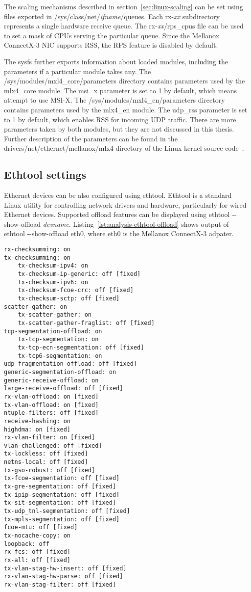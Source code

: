 The scaling mechanisms described in section~\ref{sec:linux-scaling} can be set
using files exported in /sys/class/net/{\it{ifname}}/queues.
Each rx-{\it{xx}} subdirectory represents a single hardware receive queue.
The rx-{\it{xx}}/rps_cpus file can be used to set a mask of CPUs serving the particular queue.
Since the Mellanox ConnectX-3 NIC supports RSS, the RPS feature is disabled by default.


The sysfs further exports information about loaded modules, including the parameters if a particular module takes any.
The /sys/modules/mxl4\_core/parameters directory contains parameters used by the mlx4\_core module.
The msi\_x parameter is set to 1 by default, which means attempt to use MSI-X.
The /sys/modules/mxl4\_en/parameters directory contains parameters used by the mlx4\_en module.
The udp\_rss parameter is set to 1 by default, which enables RSS for incoming UDP traffic.
There are more parameters taken by both modules, but they are not discussed in this thesis.
Further description of the parameters can be found
in the drivers/net/ethernet/mellanox/mlx4 directory of the Linux kernel source code~\cite{kernel-source}.

\subsection{Ethtool settings}
Ethernet devices can be also configured using ethtool.
Ethtool is a standard Linux utility for controlling network drivers and hardware, particularly for
wired Ethernet devices.
Supported offload features can be displayed using ethtool -{}-show-offload {\it{devname}}.
Listing~\ref{lst:analysis-ethtool-offload} shows output of ethtool -{}-show-offload eth0,
where eth0 is the Mellanox ConnectX-3 adpater.

\begin{lstlisting}[caption={Output of ethtool -{}-show-offload for Mellanox ConnectX3 adapter},label={lst:analysis-ethtool-offload}]
rx-checksumming: on
tx-checksumming: on
	tx-checksum-ipv4: on
	tx-checksum-ip-generic: off [fixed]
	tx-checksum-ipv6: on
	tx-checksum-fcoe-crc: off [fixed]
	tx-checksum-sctp: off [fixed]
scatter-gather: on
	tx-scatter-gather: on
	tx-scatter-gather-fraglist: off [fixed]
tcp-segmentation-offload: on
	tx-tcp-segmentation: on
	tx-tcp-ecn-segmentation: off [fixed]
	tx-tcp6-segmentation: on
udp-fragmentation-offload: off [fixed]
generic-segmentation-offload: on
generic-receive-offload: on
large-receive-offload: off [fixed]
rx-vlan-offload: on [fixed]
tx-vlan-offload: on [fixed]
ntuple-filters: off [fixed]
receive-hashing: on
highdma: on [fixed]
rx-vlan-filter: on [fixed]
vlan-challenged: off [fixed]
tx-lockless: off [fixed]
netns-local: off [fixed]
tx-gso-robust: off [fixed]
tx-fcoe-segmentation: off [fixed]
tx-gre-segmentation: off [fixed]
tx-ipip-segmentation: off [fixed]
tx-sit-segmentation: off [fixed]
tx-udp_tnl-segmentation: off [fixed]
tx-mpls-segmentation: off [fixed]
fcoe-mtu: off [fixed]
tx-nocache-copy: on
loopback: off
rx-fcs: off [fixed]
rx-all: off [fixed]
tx-vlan-stag-hw-insert: off [fixed]
rx-vlan-stag-hw-parse: off [fixed]
rx-vlan-stag-filter: off [fixed]
\end{lstlisting}

